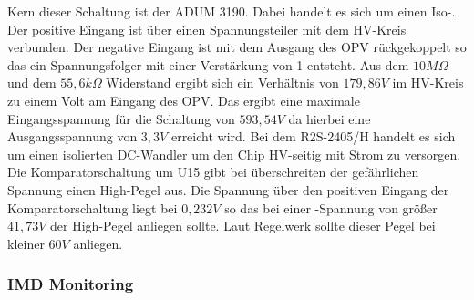 Kern dieser Schaltung ist der ADUM 3190. Dabei handelt es sich um einen \ac{Iso}-. Der positive Eingang ist über einen Spannungsteiler mit dem \ac{HV}-Kreis verbunden. Der negative Eingang ist mit dem Ausgang des \ac{OPV} rückgekoppelt so das ein Spannungsfolger mit einer Verstärkung von 1 entsteht. Aus dem \ensuremath{10 M\Omega} und dem \ensuremath{55,6 k\Omega} Widerstand ergibt sich ein Verhältnis von \ensuremath{179,86 V} im \ac{HV}-Kreis zu einem Volt am Eingang des \ac{OPV}. Das ergibt eine maximale Eingangsspannung für die Schaltung von \ensuremath{593,54 V} da hierbei eine Ausgangsspannung von \ensuremath{3,3 V} erreicht wird. Bei dem R2S-2405/H handelt es sich um einen isolierten \ac{DC}-Wandler um den Chip \ac{HV}-seitig mit Strom zu versorgen. Die Komparatorschaltung um U15 gibt bei überschreiten der gefährlichen Spannung einen High-Pegel aus. Die Spannung über den positiven Eingang der Komparatorschaltung liegt bei \ensuremath{0,232 V} so das bei einer -Spannung von größer \ensuremath{41,73 V} der High-Pegel anliegen sollte. Laut Regelwerk sollte dieser Pegel bei kleiner \ensuremath{60V} anliegen.

\FloatBarrier
\subsubsection{\ac{IMD} Monitoring}

